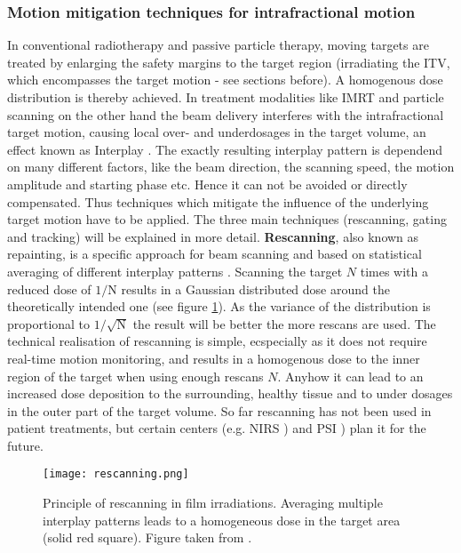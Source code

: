 \documentclass[type=dr, dr=rernat, accentcolor=tud7b,colorbacktitle, bigchapter, openright, twoside, 12pt ]{tudthesis}
\begin{document}
\subsubsection{Motion mitigation techniques for intrafractional motion}

In conventional radiotherapy and passive particle therapy, moving targets are treated by enlarging the safety margins to the target region 
(irradiating the ITV, which encompasses the target motion - see sections before). A homogenous dose distribution is thereby achieved. 
In treatment modalities like IMRT and particle scanning on the other hand the beam delivery interferes with the intrafractional target 
motion, causing local over- and underdosages in the target volume, an effect known as Interplay \cite{Phi92} \cite{Ber08}. 
The exactly resulting interplay pattern is dependend on many different factors, like the beam direction, the scanning speed, the motion 
amplitude and starting phase etc. Hence it can not be avoided or directly compensated. Thus techniques which mitigate the influence 
of the underlying target motion have to be applied. The three main techniques (rescanning, gating and tracking) will be explained in more 
detail.\newline
\newline
\textbf{Rescanning}, also known as repainting, is a specific approach for beam scanning and based on statistical averaging of different 
interplay patterns \cite{Phi92} \cite{Rie10}. Scanning the target $N$ times with a reduced dose of $\mathrm{1}/\mathrm{N}$ results in a 
Gaussian distributed dose around the theoretically intended one (see figure \ref{rescanning}). As the variance of the distribution is proportional 
to $\mathrm{1}/\mathrm{\sqrt{N}}$ the result will be better the more rescans are used. The technical realisation of rescanning is simple, 
ecspecially as it does not require real-time motion monitoring, and results in a homogenous dose to the inner region of the target when 
using enough rescans $N$. Anyhow it can lead to an increased dose deposition to the surrounding, healthy tissue and to under dosages in 
the outer part of the target volume. So far rescanning has not been used in patient treatments, but certain centers (e.g. NIRS \cite{Fur07}) 
and PSI \cite{Zen10}) plan it for the future.


\begin{figure}[H]
\begin{center}
\texttt{[image: rescanning.png]}
\caption{Principle of rescanning in film irradiations. Averaging multiple interplay patterns leads to a homogeneous dose in the target area 
(solid red square). Figure taken from \cite{Ber09b}. }
\label{rescanning}
\end{center}
\end{figure}
\end{document}
